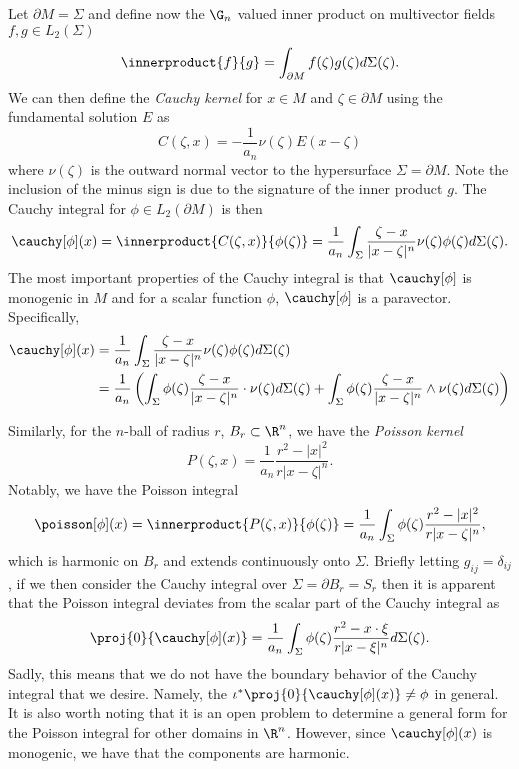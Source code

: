 Let $\partial M = \Sigma$ and define now the $\G_n$ valued inner product on multivector fields $f,g \in L_2(\Sigma)$
\[
\innerproduct{f}{g} = \int_{\partial M} f(\zeta)g(\zeta)d\Sigma(\zeta).
\]
We can then define the \emph{Cauchy kernel} for $x\in M$ and $\zeta \in \partial M$ using the fundamental solution $E$ as
\[
C(\zeta, x) = -\frac{1}{a_n} \nu(\zeta) E(x-\zeta)
\]
where $\nu(\zeta)$ is the outward normal vector to the hypersurface $\Sigma = \partial M$. Note the inclusion of the minus sign is due to the signature of the inner product $g$. The Cauchy integral for $\phi \in L_2(\partial M)$ is then
\[
\cauchy[\phi](x) = \innerproduct{C(\zeta,x)}{\phi(\zeta)} =\frac{1}{a_n} \int_{\Sigma} \frac{\zeta-x}{|x-\zeta|^n} \nu(\zeta) \phi(\zeta) d\Sigma(\zeta).
\]
The most important properties of the Cauchy integral is that $\cauchy[\phi]$ is monogenic in $M$ and for a scalar function $\phi$, $\cauchy[\phi]$ is a paravector.  Specifically,
\begin{align*}
\cauchy[\phi](x) &= \frac{1}{a_n} \int_{\Sigma} \frac{\zeta-x}{|x-\zeta|^n} \nu(\zeta) \phi(\zeta) d\Sigma(\zeta)\\
&= \frac{1}{a_n} \left(\int_{\Sigma} \phi(\zeta) \frac{\zeta-x}{|x-\zeta|^n} \cdot \nu(\zeta) d\Sigma(\zeta) + \int_{\Sigma} \phi(\zeta) \frac{\zeta-x}{|x-\zeta|^n} \wedge \nu(\zeta) d\Sigma(\zeta)\right)
\end{align*}

Similarly, for the $n$-ball of radius $r$, $B_r \subset \R^n$, we have the \emph{Poisson kernel}
\[
P(\zeta,x) = \frac{1}{a_n}\frac{r^2-|x|^2}{r|x-\zeta|^n}.
\]
Notably, we have the Poisson integral
\[
\poisson[\phi](x) = \innerproduct{P(\zeta,x)}{\phi(\zeta)} = \frac{1}{a_n} \int_\Sigma \phi(\zeta) \frac{r^2-|x|^2}{r|x-\zeta|^n},
\]
which is harmonic on $B_r$ and extends continuously onto $\Sigma$. Briefly letting $g_{ij}=\delta_{ij}$, if we then consider the Cauchy integral over $\Sigma = \partial B_r = S_r$ then it is apparent that the Poisson integral deviates from the scalar part of the Cauchy integral as
\[
\proj{0}{\cauchy[\phi](x)} = \frac{1}{a_n} \int_\Sigma \phi(\zeta) \frac{r^2- x\cdot \xi}{r|x-\xi|^n} d\Sigma (\zeta).
\]
Sadly, this means that we do not have the boundary behavior of the Cauchy integral that we desire.  Namely, the $\iota^* \proj{0}{\cauchy[\phi](x)}\neq \phi$ in general. It is also worth noting that it is an open problem to determine a general form for the Poisson integral for other domains in $\R^n$. However, since $\cauchy[\phi](x)$ is monogenic, we have that the components are harmonic.

